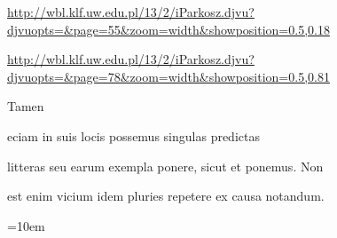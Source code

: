 
\newParkoszpage

{
\url{http://wbl.klf.uw.edu.pl/13/2/iParkosz.djvu?djvuopts=&page=55&zoom=width&showposition=0.5,0.18}

\url{http://wbl.klf.uw.edu.pl/13/2/iParkosz.djvu?djvuopts=&page=78&zoom=width&showposition=0.5,0.81}
}

\bigskip

\obeylines
\mono



\fullpreviouslines


{
\color{blue}

Tamen 

eciam in suis locis possemus singulas predictas 
}


\fulllines

litteras seu earum exempla ponere, sicut et ponemus. Non

est enim vicium idem pluries repetere ex causa notandum.



\def\splitverse{\advance\plineno by 1\psublineno=0\everypar{\advance\psublineno by 1\llap{\textcolor{green}{\the\ppageno-\ifnum\plineno<10 0\fi\the \plineno-\the\psublineno \ }}\hskip5em}}

\def\fullverselines{\everypar{\advance\plineno by 1\llap{\the\ppageno-\ifnum\plineno<10 0\fi\the \plineno \hskip 1.5em}\hskip5em}}


\def\newverse{\advance\plineno by 1\psublineno=0\hskip10em}
\def\newversesubline{\hskip\indentV}
\def\newverseline{\advance\plineno by 1\psublineno=0}
\newdimen\indentV
\indentV=10em
\def\indentVerse{\hskip\indentV{}}


